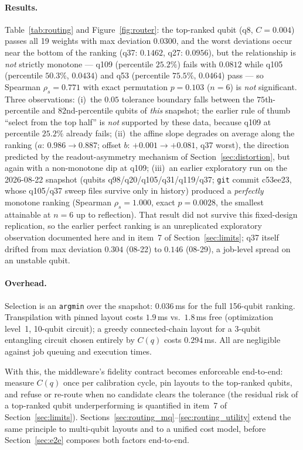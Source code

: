 ﻿\documentclass[12pt,a4paper]{article}
\begin{document}
\paragraph{Results.} Table~\ref{tab:routing} and Figure~\ref{fig:router}: the top-ranked qubit (q8, $C{=}0.004$) passes all 19 weights with max deviation $0.0300$, and the worst deviations occur near the bottom of the ranking (q37: $0.1462$, q27: $0.0956$), but the relationship is \emph{not} strictly monotone --- q109 (percentile $25.2\%$) fails with $0.0812$ while q105 (percentile $50.3\%$, $0.0434$) and q53 (percentile $75.5\%$, $0.0464$) pass --- so Spearman $\rho_s = 0.771$ with exact permutation $p = 0.103$ ($n{=}6$) is \emph{not} significant. Three observations: (i)~the $0.05$ tolerance boundary falls between the $75$th-percentile and $82$nd-percentile qubits of \emph{this} snapshot; the earlier rule of thumb ``select from the top half'' is \emph{not} supported by these data, because q109 at percentile $25.2\%$ already fails; (ii)~the affine slope degrades on average along the ranking ($a$: $0.986 \to 0.887$; offset $b$: $+0.001 \to +0.081$, q37 worst), the direction predicted by the readout-asymmetry mechanism of Section~\ref{sec:distortion}, but again with a non-monotone dip at q109; (iii)~an earlier exploratory run on the 2026-08-22 snapshot (qubits q98/q20/q105/q31/q119/q37; \texttt{git} commit c53ee23, whose q105/q37 sweep files survive only in history) produced a \emph{perfectly} monotone ranking (Spearman $\rho_s = 1.000$, exact $p = 0.0028$, the smallest attainable at $n{=}6$ up to reflection). That result did not survive this fixed-design replication, so the earlier perfect ranking is an unreplicated exploratory observation documented here and in item~7 of Section~\ref{sec:limits}; q37 itself drifted from max deviation $0.304$ (08-22) to $0.146$ (08-29), a job-level spread on an unstable qubit.

\paragraph{Overhead.} Selection is an \texttt{argmin} over the snapshot: $0.036$\,ms for the full 156-qubit ranking. Transpilation with pinned layout costs $1.9$\,ms vs.\ $1.8$\,ms free (optimization level~1, 10-qubit circuit); a greedy connected-chain layout for a 3-qubit entangling circuit chosen entirely by $C(q)$ costs $0.294$\,ms. All are negligible against job queuing and execution times.

With this, the middleware's fidelity contract becomes enforceable end-to-end: measure $C(q)$ once per calibration cycle, pin layouts to the top-ranked qubits, and refuse or re-route when no candidate clears the tolerance (the residual risk of a top-ranked qubit underperforming is quantified in item~7 of Section~\ref{sec:limits}). Sections~\ref{sec:routing_mq}--\ref{sec:routing_utility} extend the same principle to multi-qubit layouts and to a unified cost model, before Section~\ref{sec:e2e} composes both factors end-to-end.
\end{document}
